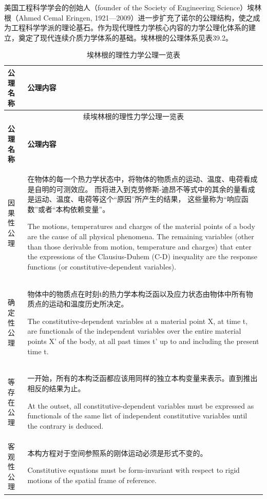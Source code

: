 \documentclass[12pt, a4paper, oneside, UTF8]{ctexbook}  %
\begin{document}
美国工程科学学会的创始人（founder of the Society of Engineering Science）埃林根（Ahmed Cemal Eringen, 1921—2009）进一步扩充了诺尔的公理结构，使之成为工程科学学派的理论基石。作为现代理性力学核心内容的力学公理化体系的建立，奠定了现代连续介质力学体系的基础。埃林根的公理体系见表39.2。
\begin{longtable}{|p{}|p{}|}
    \caption{埃林根的理性力学公理一览表} \\
    \hline
    \textbf{公理名称} & \textbf{公理内容} \\
    \hline
    \endfirsthead
    
    \multicolumn{2}{c}{续埃林根的理性力学公理一览表} \\
    \hline
    \textbf{公理名称} & \textbf{公理内容} \\
    \hline
    \endhead
    
    \hline
    \endfoot
    
    因果性公理 & 
    在物体的每一个热力学状态中，将物体的物质点的运动、温度、电荷看成是自明的可测效应。
    而将进入到克劳修斯-迪昂不等式中的其余的量看成是运动、温度、电荷等这个“原因”所产生的结果，
    这些量称为“响应函数”或者“本构依赖变量”。\par
    The motions, temperatures and charges of the material points of a body are the cause of all physical phenomena. The remaining variables (other than those derivable from motion, temperature and charges) that enter the expressions of the Clausius-Duhem (C-D) inequality are the response functions (or constitutive-dependent variables). \\
    \hline
    
    确定性公理 & 
    物体中的物质点在时刻t的热力学本构泛函以及应力状态由物体中所有物质点的运动和温度历史所决定。\par
    The constitutive-dependent variables at a material point X, at time t, are functionals of the independent variables over the entire material points X' of the body, at all past times t' up to and including the present time t. \\
    \hline
    
    等存在公理 & 
    一开始，所有的本构泛函都应该用同样的独立本构变量来表示。直到推出相反的结果为止。\par
    At the outset, all constitutive-dependent variables must be expressed as functionals of the same list of independent constitutive variables until the contrary is deduced. \\
    \hline
    
    客观性公理 & 
    本构方程对于空间参照系的刚体运动必须是形式不变的。\par
    Constitutive equations must be form-invariant with respect to rigid motions of the spatial frame of reference. \\
    \hline
    

\end{longtable}
\end{document}
